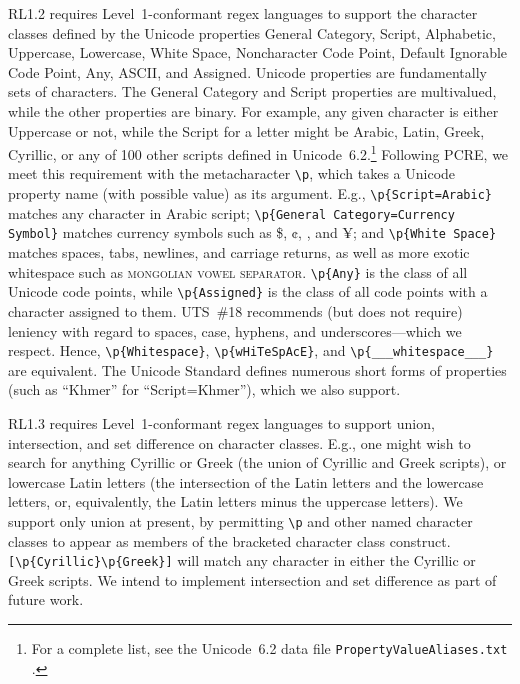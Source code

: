 \documentclass[5p,final,number,sort&compress]{elsarticle}
\newcommand{\re}[1]{\texttt{#1}}
\newcommand*{\whack}{\textbackslash}
\begin{document}
RL1.2 requires Level~1-conformant regex languages to support the character classes defined by the Unicode properties General Category, Script, Alphabetic, Uppercase, Lowercase, White Space, Noncharacter Code Point, Default Ignorable Code Point, Any, ASCII, and Assigned. Unicode properties are fundamentally sets of characters. The General Category and Script properties are multivalued, while the other properties are binary. For example, any given character is either Uppercase or not, while the Script for a letter might be Arabic, Latin, Greek, Cyrillic, or any of 100 other scripts defined in Unicode~6.2.\footnote{For a complete list, see the Unicode~6.2 data file \texttt{PropertyValueAliases.txt} \citep{pva62}.} Following PCRE, we meet this requirement with the metacharacter \re{\whack p}, which takes a Unicode property name (with possible value) as its argument. E.g., \re{\whack p\{Script=Arabic\}} matches any character in Arabic script; \re{\whack p\{General Category=Currency Symbol\}} matches currency symbols such as \$, ¢, \texteuro, and ¥; and \re{\whack p\{White Space\}} matches spaces, tabs, newlines, and carriage returns, as well as more exotic whitespace such as \textsc{mongolian vowel separator}.  \re{\whack p\{Any\}} is the class of all Unicode code points, while \re{\whack p\{Assigned\}} is the class of all code points with a character assigned to them. UTS~\#18 recommends (but does not require) leniency with regard to spaces, case, hyphens, and underscores---which we respect. Hence, \re{\whack p\{Whitespace\}}, \re{\whack p\{wHiTeSpAcE\}}, and \re{\whack p\{\_\_\_white\;\;\;\;space\_\_\_\}} are equivalent. The Unicode Standard defines numerous short forms of properties (such as ``Khmer'' for ``Script=Khmer''), which we also support.

RL1.3 requires Level~1-conformant regex languages to support union, intersection, and set difference on character classes. E.g., one might wish to search for anything Cyrillic or Greek (the union of Cyrillic and Greek scripts), or lowercase Latin letters (the intersection of the Latin letters and the lowercase letters, or, equivalently, the Latin letters minus the uppercase letters). We support only union at present, by permitting \re{\whack p} and other named character classes to appear as members of the bracketed character class construct. \re{[\whack p\{Cyrillic\}\whack p\{Greek\}]} will match any character in either the Cyrillic or Greek scripts. We intend to implement intersection and set difference as part of future work. 
\end{document}
